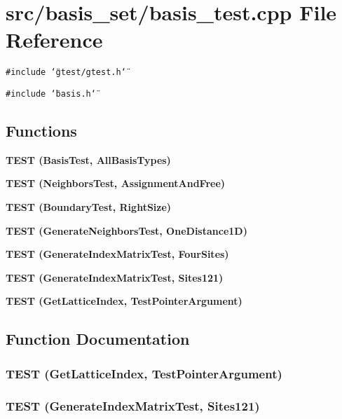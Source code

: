 \section{src/basis\_\-set/basis\_\-test.cpp File Reference}
\label{basis__test_8cpp}
{\tt \#include \char`\"{}gtest/gtest.h\char`\"{}}\par
{\tt \#include \char`\"{}basis.h\char`\"{}}\par
\subsection*{Functions}
\begin{CompactItemize}
\item 
\bf{TEST} (Basis\-Test, All\-Basis\-Types)
\item 
\bf{TEST} (Neighbors\-Test, Assignment\-And\-Free)
\item 
\bf{TEST} (Boundary\-Test, Right\-Size)
\item 
\bf{TEST} (Generate\-Neighbors\-Test, One\-Distance1D)
\item 
\bf{TEST} (Generate\-Index\-Matrix\-Test, Four\-Sites)
\item 
\bf{TEST} (Generate\-Index\-Matrix\-Test, Sites121)
\item 
\bf{TEST} (Get\-Lattice\-Index, Test\-Pointer\-Argument)
\end{CompactItemize}


\subsection{Function Documentation}
\subsubsection{\setlength{\rightskip}{0pt plus 5cm}TEST (Get\-Lattice\-Index, Test\-Pointer\-Argument)}\label{basis__test_8cpp_f987b3e776acc69d7c0145c82f98d48e}


\subsubsection{\setlength{\rightskip}{0pt plus 5cm}TEST (Generate\-Index\-Matrix\-Test, Sites121)}\label{basis__test_8cpp_e305c14256a9148953581e5d67f2a5d7}


